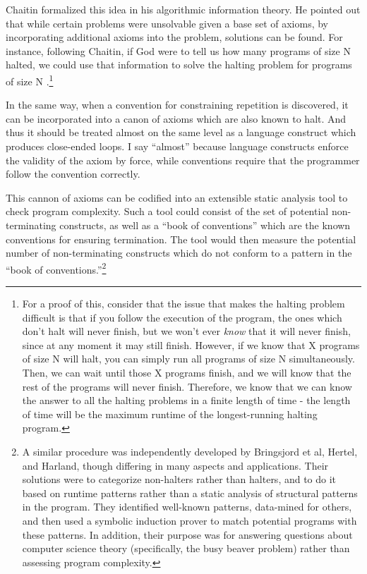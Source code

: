 Chaitin formalized this idea in his algorithmic information theory.  He pointed out that while certain problems were unsolvable given a base set of axioms, by incorporating additional axioms into the problem, solutions can be found.  For instance, following Chaitin, if God were to tell us how many programs of size N halted, we could use that information to solve the halting problem for programs of size N \cite{chaitin}.\footnote{For a proof of this, consider that the issue that makes the halting problem difficult is that if you follow the execution of the program, the ones which don't halt will never finish, but we won't ever \emph{know} that it will never finish, since at any moment it may still finish.  However, if we know that X programs of size N will halt, you can simply run all programs of size N simultaneously.  Then, we can wait until those X programs finish, and we will know that the rest of the programs will never finish.  Therefore, we know that we can know the answer to all the halting problems in a finite length of time - the length of time will be the maximum runtime of the longest-running halting program.}

In the same way, when a convention for constraining repetition is discovered, it can be incorporated into a canon of axioms which are also known to halt.  And thus it should be treated almost on the same level as a language construct which produces close-ended loops.  I say ``almost'' because language constructs enforce the validity of the axiom by force, while conventions require that the programmer follow the convention correctly.

This cannon of axioms can be codified into an extensible static analysis tool to check program complexity.  Such a tool could consist of the set of potential non-terminating constructs, as well as a ``book of conventions'' which are the known conventions for ensuring termination.  The tool would then measure the potential number of non-terminating constructs which do not conform to a pattern in the ``book of conventions.''\footnote{A similar procedure was independently developed by Bringsjord et al\cite{bringsjord}, Hertel\cite{hertel}, and Harland\cite{harland}, though differing in many aspects and applications.  Their solutions were to categorize non-halters rather than halters, and to do it based on runtime patterns rather than a static analysis of structural patterns in the program.  They identified well-known patterns, data-mined for others, and then used a symbolic induction prover to match potential programs with these patterns. In addition, their purpose was for answering questions about computer science theory (specifically, the busy beaver problem) rather than assessing program complexity.}

